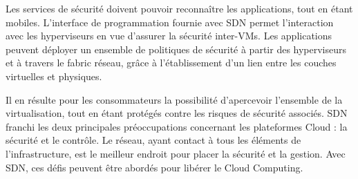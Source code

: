Les services de sécurité doivent pouvoir reconnaître les applications, tout en étant mobiles. L'interface de programmation fournie avec SDN permet l'interaction avec les hyperviseurs en vue d'assurer la sécurité inter-VMs. Les applications peuvent déployer un ensemble de politiques de sécurité à partir des hyperviseurs et à travers le \gls{fabric} réseau, grâce à l'établissement d'un lien entre les couches virtuelles et physiques. 

Il en résulte pour les consommateurs la possibilité d'apercevoir l'ensemble de la virtualisation, tout en étant protégés contre les risques de sécurité associés. SDN franchi les deux principales préoccupations concernant les plateformes Cloud : la sécurité et le contrôle. Le réseau, ayant contact à tous les éléments de l'infrastructure, est le meilleur endroit pour placer la sécurité et la gestion. Avec SDN, ces défis peuvent être abordés pour libérer le Cloud Computing. 

